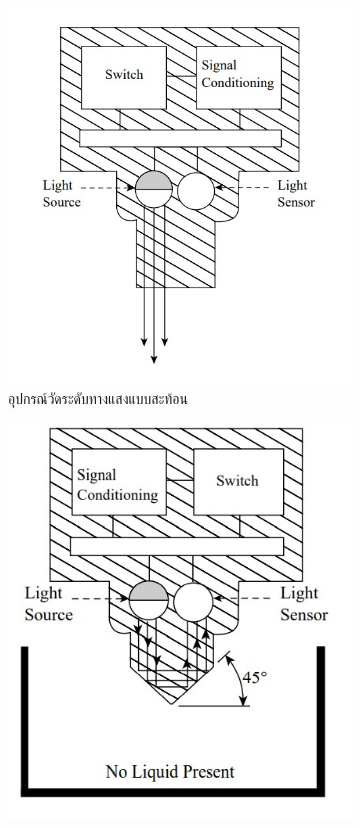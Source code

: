 \documentclass[final,11pt,a4paper]{article}
\begin{document}
\begin{figure}
    \begin{subfigure}[b]{0.4\textwidth}
        \centering
        \includegraphics[width=\textwidth]{images/Screenshot_23.jpg}
        \caption{อุปกรณ์วัดระดับทางแสงแบบสะท้อน}
        \label{fig:ols1}
    \end{subfigure}
    \hfill
    \begin{subfigure}[b]{0.35\textwidth}
        \centering
        \includegraphics[width=\textwidth]{images/Screenshot_7.jpg}

\end{subfigure}
\end{figure}
\end{document}
